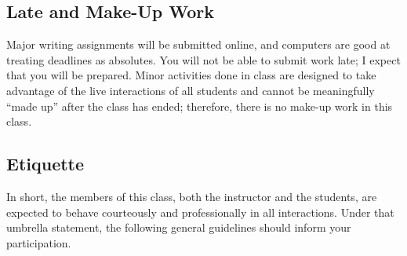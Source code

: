 \documentclass[11pt,oneside]{amsart}	%
\begin{document}
\subsection{Late and Make-Up Work} %
\label{sub:late_and_make_up_work}
Major writing assignments will be submitted online, and computers are good at treating deadlines as absolutes. You will not be able to submit work late; I expect that you will be prepared. Minor activities done in class are designed to take advantage of the live interactions of all students and cannot be meaningfully ``made up'' after the class has ended; therefore, there is no make-up work in this class.

\subsection{Etiquette}
In short, the members of this class, both the instructor and the students, are expected to behave courteously and professionally in all interactions.  Under that umbrella statement, the following general guidelines should inform your participation.
\end{document}
